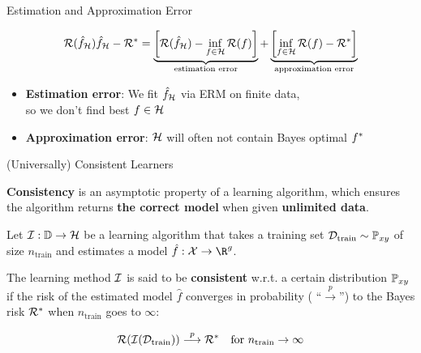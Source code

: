 \documentclass[11pt,compress,t,notes=noshow, xcolor=table]{beamer}
\begin{document}
\begin{frame}{Estimation and Approximation Error} 







$$
\mathcal{R}(\hat f_{\mathcal{H}}) \hat f_{\mathcal{H}} - \mathcal{R}^\ast = \underbrace{\left[\mathcal{R}(\hat f_{\mathcal{H}}) - \inf_{f \in \mathcal{H}} \mathcal{R}(f)\right]}_{\text{estimation error}} + \underbrace{\left[\inf_{f \in \mathcal{H}} \mathcal{R}(f) - \mathcal{R}^\ast\right]}_{\text{approximation error}}  
$$

\vfill

\begin{itemize}
\item \textbf{Estimation error}:
We fit $\hat f_{\mathcal{H}}$ via ERM on finite data, \\
so we don't find best $f \in \mathcal{H}$
\item \textbf{Approximation error}: 
$\mathcal{H}$ will often not contain Bayes optimal $f^{\ast}$ 
\end{itemize}

\end{frame}


\begin{frame}{(Universally) Consistent Learners }

\textbf{Consistency} is an asymptotic property of a learning algorithm, which ensures the algorithm returns \textbf{the correct model} when given \textbf{unlimited data}.

\vfill 

Let $\mathcal{I}:\mathbb{D} \to \mathcal{H}$ be a learning algorithm that takes a training set $\mathcal{D}_{\text{train}} \sim \mathbb{P}_{xy}$ of size $n_\text{train}$ and estimates a model $\hat f: \Xspace \to \R^g$. 

\vfill 

The learning method $\mathcal{I}$ is said to be \textbf{consistent} w.r.t. a certain distribution $\mathbb{P}_{xy}$ if the risk of the estimated model $\hat f$ converges in probability ( \enquote{$\overset{p}{\longrightarrow}$}) to the Bayes risk $\mathcal{R}^\ast$ when $n_\text{train}$ goes to $\infty$: 

$$
\mathcal{R}(\mathcal{I}(\mathcal{D}_{\text{train}})) \overset{p}{\longrightarrow} \mathcal{R}^\ast \quad \text{for } n_\text{train} \to \infty
$$

\end{frame}
\end{document}
